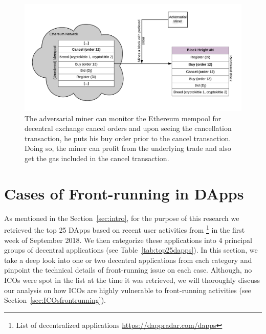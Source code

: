 \begin{figure}[h]
\centering
\includegraphics[width=0.7\linewidth]{figures/Miner_reorder_frontrun.png}
\caption{The adversarial miner can monitor the Ethereum mempool for decentral exchange cancel orders and upon seeing the cancellation transaction, he puts his buy order prior to the cancel transaction. Doing so, the miner can profit from the underlying trade and also get the gas included in the cancel transaction. \label{fig:MinerFrontrunning}} 
\end{figure}



\section{Cases of Front-running in DApps}  

As mentioned in the Section~\ref{sec:intro}, for the purpose of this research we retrieved the top 25 DApps based on recent user activities from \footnote{List of decentralized applications \url{https://dappradar.com/dapps}} in the first week of September 2018. We then categorize these applications into 4 principal groups of decentral applications (see Table~\ref{tab:top25dapps}). In this section, we take a deep look into one or two decentral applications from each category and pinpoint the technical details of front-running issue on each case. Although, no ICOs were spot in the list at the time it was retrieved, we will thoroughly discuss our analysis on how ICOs are highly vulnerable to front-running activities (see Section~\ref{sec:ICOsfrontrunning}).




